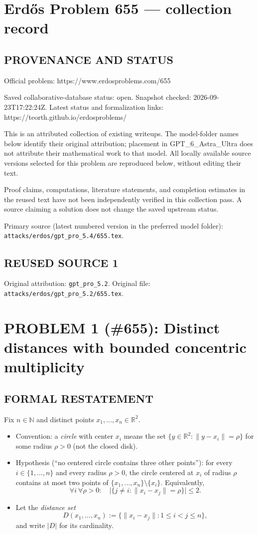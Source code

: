 \section*{Erd\H{o}s Problem 655 --- collection record}

\subsection*{PROVENANCE AND STATUS}
Official problem: https://www.erdosproblems.com/655

Saved collaborative-database status: open.
Snapshot checked: 2026-09-23T17:22:24Z.
Latest status and formalization links: https://teorth.github.io/erdosproblems/

This is an attributed collection of existing writeups. The model-folder names below identify their original attribution; placement in GPT\_6\_Astra\_Ultra does not attribute their mathematical work to that model. All locally available source versions selected for this problem are reproduced below, without editing their text.

Proof claims, computations, literature statements, and completion estimates in the reused text have not been independently verified in this collection pass. A source claiming a solution does not change the saved upstream status.

Primary source (latest numbered version in the preferred model folder): \texttt{attacks/erdos/gpt\_pro\_5.4/655.tex}.

\subsection*{REUSED SOURCE 1}
Original attribution: \texttt{gpt\_pro\_5.2}.
Original file: \texttt{attacks/erdos/gpt\_pro\_5.2/655.tex}.

\section*{PROBLEM 1 (\#655): Distinct distances with bounded concentric multiplicity}

\subsection*{FORMAL RESTATEMENT}
Fix $n\in\mathbb{N}$ and distinct points $x_1,\dots,x_n\in\mathbb{R}^2$.

\begin{itemize}[leftmargin=*]
\item Convention: a \emph{circle} with center $x_i$ means the set $\{y\in\mathbb{R}^2: \|y-x_i\|=\rho\}$ for some radius $\rho>0$ (not the closed disk).
\item Hypothesis (``no centered circle contains three other points''): for every $i\in\{1,\dots,n\}$ and every radius $\rho>0$, the circle centered at $x_i$ of radius $\rho$ contains at most two points of $\{x_1,\dots,x_n\}\setminus\{x_i\}$. Equivalently,
\[
\forall i\ \forall \rho>0:\quad \bigl|\{j\neq i: \|x_i-x_j\|=\rho\}\bigr|\le 2.
\]
\item Let the \emph{distance set}
\[
D(x_1,\dots,x_n):=\{\|x_i-x_j\|: 1\le i<j\le n\},
\]
and write $|D|$ for its cardinality.
\end{itemize}


